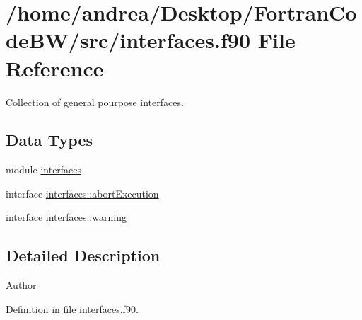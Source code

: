 \hypertarget{interfaces_8f90}{\section{/home/andrea/\-Desktop/\-Fortran\-Code\-B\-W/src/interfaces.f90 File Reference}
\label{interfaces_8f90}
}


Collection of general pourpose interfaces.  


\subsection*{Data Types}
\begin{DoxyCompactItemize}
\item 
module \hyperlink{classinterfaces}{interfaces}
\item 
interface \hyperlink{interfaceinterfaces_1_1abort_execution}{interfaces\-::abort\-Execution}
\item 
interface \hyperlink{interfaceinterfaces_1_1warning}{interfaces\-::warning}
\end{DoxyCompactItemize}


\subsection{Detailed Description}
\begin{DoxyAuthor}{Author}

\end{DoxyAuthor}


Definition in file \hyperlink{interfaces_8f90_source}{interfaces.\-f90}.

